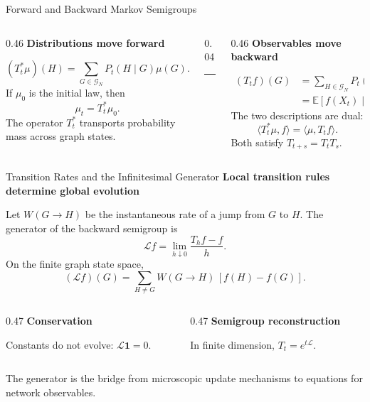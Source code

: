 \documentclass[11pt]{beamer}
\newcommand{\eyebrow}[1]{%
  {\color{accent}\bfseries #1}\par
  \vspace{0.04cm}{\color{lightgray}\rule{\linewidth}{0.45pt}}\vspace{0.10cm}}
\newcommand{\keyterm}[1]{\textcolor{accent}{\bfseries #1}}
\begin{document}
\begin{frame}{Forward and Backward Markov Semigroups}
  \small
  \begin{columns}[T,onlytextwidth]
    \begin{column}{0.46\textwidth}
      \eyebrow{Distributions move forward}
      \[
        (T_t^*\mu)(H)
        =\sum_{G\in\mathcal G_N}P_t(H\mid G)\mu(G).
      \]
      If $\mu_0$ is the initial law, then
      \[
        \mu_t=T_t^*\mu_0.
      \]
      The operator $T_t^*$ transports probability mass across graph states.
    \end{column}
    \begin{column}{0.04\textwidth}
      \centering
      {\color{lightgray}\rule{0.45pt}{5.4cm}}
    \end{column}
    \begin{column}{0.46\textwidth}
      \eyebrow{Observables move backward}
      \begin{align*}
        (T_tf)(G)
        &=\sum_{H\in\mathcal G_N}P_t(H\mid G)f(H)\\
        &=\mathbb E[f(X_t)\mid X_0=G].
      \end{align*}
      The two descriptions are dual:
      \[
        \langle T_t^*\mu,f\rangle
        =\langle\mu,T_tf\rangle.
      \]
      Both satisfy $T_{t+s}=T_tT_s$.
    \end{column}
  \end{columns}
\end{frame}

\begin{frame}{Transition Rates and the Infinitesimal Generator}
  \small
  \eyebrow{Local transition rules determine global evolution}

  Let $W(G\to H)$ be the instantaneous rate of a jump from $G$ to $H$.
  The generator of the backward semigroup is
  \[
    \mathcal Lf
    =\lim_{h\downarrow0}\frac{T_hf-f}{h}.
  \]
  On the finite graph state space,
  \[
    (\mathcal Lf)(G)
    =\sum_{H\neq G}W(G\to H)\,[f(H)-f(G)].
  \]

  \vspace{0.30cm}
  \begin{columns}[T,onlytextwidth]
    \begin{column}{0.47\textwidth}
      \keyterm{Conservation}\par
      Constants do not evolve: $\mathcal L\mathbf 1=0$.
    \end{column}
    \begin{column}{0.47\textwidth}
      \keyterm{Semigroup reconstruction}\par
      In finite dimension, $T_t=e^{t\mathcal L}$.
    \end{column}
  \end{columns}

  \vspace{0.35cm}
  {\color{softgray}\small
  The generator is the bridge from microscopic update mechanisms to equations for network observables.}
\end{frame}
\end{document}
